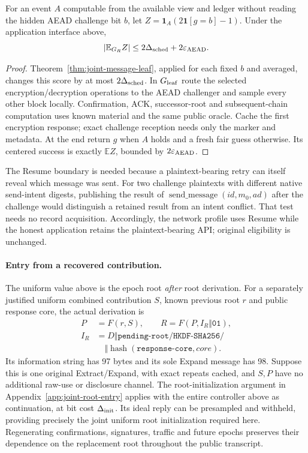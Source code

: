 \begin{corollary}
\label{cor:joint-first-message}
For an event $A$ computable from the available view and ledger without
reading the hidden AEAD challenge bit $b$, let
$Z=\mathbf1_A(2\mathbf1[g=b]-1)$.
Under the application interface above,
\[
 |\mathbb E_{G_R}Z|
 \le 2\Delta_{\rm sched}+2\varepsilon_{\rm AEAD}.
\]
\end{corollary}
\begin{proof}
Theorem~\ref{thm:joint-message-leaf}, applied for each fixed $b$ and
averaged, changes this score by at most $2\Delta_{\rm sched}$.
In $G_{\rm leaf}$ route the selected encryption/decryption operations
to the AEAD challenger and sample every other block locally.
Confirmation, ACK, successor-root and subsequent-chain computation uses
known material and the same public oracle. Cache the first encryption
response; exact challenge reception needs only the marker and metadata.
At the end return $g$ when $A$ holds and a fresh fair guess otherwise.
Its centered success is exactly $\mathbb E Z$, bounded by
$2\varepsilon_{\rm AEAD}$.
\end{proof}

The Resume boundary is needed because a plaintext-bearing retry can
itself reveal which message was sent. For two challenge plaintexts with
different native send-intent digests, publishing the result of
$\operatorname{send\_message}(id,m_0,ad)$ after the challenge would
distinguish a retained result from an intent conflict. That test needs
no record acquisition. Accordingly, the network profile uses Resume
while the honest application retains the plaintext-bearing API;
original eligibility is unchanged.

\paragraph{Entry from a recovered contribution.}
The uniform value above is the epoch root \emph{after} root derivation.
For a separately justified uniform combined contribution $S$, known
previous root $r$ and public response core, the actual derivation is
\[
\begin{aligned}
 P&=F(r,S),\qquad R=F(P,I_R\Vert\mathtt{01}),\\
 I_R&=D\Vert\texttt{pending-root/HKDF-SHA256/}\\
    &\quad\Vert\operatorname{hash}(\texttt{response-core},\mathit{core}).
\end{aligned}
\]
Its information string has 97 bytes and its sole Expand message has 98.
Suppose this is one original Extract/Expand, with exact repeats cached,
and $S,P$ have no additional raw-use or disclosure channel.
The root-initialization argument in Appendix~\ref{app:joint-root-entry}
applies with the entire controller above as continuation, at bit cost
$\Delta_{\rm init}$. Its ideal reply
can be presampled and withheld, providing precisely the joint uniform
root initialization required here. Regenerating confirmations, signatures,
traffic and future epochs preserves their dependence on the replacement
root throughout the public transcript.

